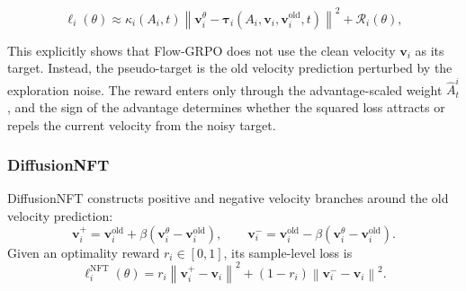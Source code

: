 \documentclass{article} %
\begin{document}
\begin{equation}
\label{eq:unified_form}
\ell_i(\theta)
\approx
\kappa_i(A_i,t)
\left\|
\mathbf{v}_i^\theta
-
\mathbf{\tau}_i
\left(
A_i,
\mathbf{v}_i,
\mathbf{v}_i^{\mathrm{old}},
t
\right)
\right\|^2
+
\mathcal{R}_i(\theta),
\end{equation}



This explicitly shows that Flow-GRPO does not use the clean velocity
\(\mathbf{v}_i\) as its target. Instead, the pseudo-target is the old
velocity prediction perturbed by the exploration noise. The reward enters
only through the advantage-scaled weight \(\hat{A}^i_t\), and the sign of
the advantage determines whether the squared loss attracts or repels the
current velocity from the noisy target.



\subsubsection{DiffusionNFT}
\label{sec:diffusionnft}

DiffusionNFT constructs positive and negative velocity branches around the old
velocity prediction:
\begin{equation}
\mathbf{v}_{i}^{+}
=
\mathbf{v}_i^{\mathrm{old}}
+
\beta
\left(
\mathbf{v}_i^\theta-\mathbf{v}_i^{\mathrm{old}}
\right),
\qquad
\mathbf{v}_{i}^{-}
=
\mathbf{v}_i^{\mathrm{old}}
-
\beta
\left(
\mathbf{v}_i^\theta-\mathbf{v}_i^{\mathrm{old}}
\right).
\end{equation}
Given an optimality reward $r_i\in[0,1]$, its sample-level loss is
\begin{equation}
\label{eq:nft_velocity_target_origin}
\ell_i^{\mathrm{NFT}}(\theta)
=
r_i
\left\|
\mathbf{v}_{i}^{+}
-
\mathbf{v}_i
\right\|^2
+
(1-r_i)
\left\|
\mathbf{v}_{i}^{-}
-
\mathbf{v}_i
\right\|^2 .
\end{equation}
\end{document}
